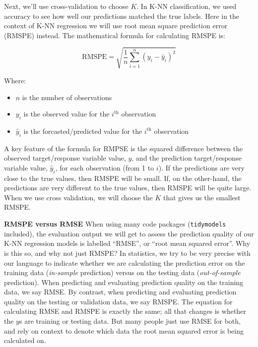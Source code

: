 \documentclass[
]{krantz}
\providecommand{\tightlist}{%
  \setlength{\itemsep}{0pt}\setlength{\parskip}{0pt}}
\renewenvironment{quote}{\begin{VF}}{\end{VF}}
\begin{document}
Next, we'll use cross-validation to choose \(K\). In K-NN classification, we used
accuracy to see how well our predictions matched the true labels. Here in the
context of K-NN regression we will use root mean square prediction error
(RMSPE) instead. The mathematical formula for calculating RMSPE is:

\[\text{RMSPE} = \sqrt{\frac{1}{n}\sum\limits_{i=1}^{n}(y_i - \hat{y}_i)^2}\]

Where:

\begin{itemize}
\tightlist
\item
  \(n\) is the number of observations
\item
  \(y_i\) is the observed value for the \(i^\text{th}\) observation
\item
  \(\hat{y}_i\) is the forcasted/predicted value for the \(i^\text{th}\) observation
\end{itemize}

A key feature of the formula for RMPSE is the squared difference between the observed
target/response variable value, \(y\), and the prediction target/response
variable value, \(\hat{y}_i\), for each observation (from 1 to \(i\)).
If the predictions are very close to the true values, then
RMSPE will be small. If, on the other-hand, the predictions are very
different to the true values, then RMSPE will be quite large. When we
use cross validation, we will choose the \(K\) that gives
us the smallest RMSPE.

\begin{quote}
\textbf{RMSPE versus RMSE}
When using many code packages (\texttt{tidymodels} included), the evaluation output
we will get to assess the prediction quality of
our K-NN regression models is labelled ``RMSE'', or ``root mean squared
error''. Why is this so, and why not just RMSPE?
In statistics, we try to be very precise with our
language to indicate whether we are calculating the prediction error on the
training data (\emph{in-sample} prediction) versus on the testing data
(\emph{out-of-sample} prediction). When predicting and evaluating prediction quality on the training data, we
say RMSE. By contrast, when predicting and evaluating prediction quality
on the testing or validation data, we say RMSPE.
The equation for calculating RMSE and RMSPE is exactly the same; all that changes is whether the \(y\)s are
training or testing data. But many people just use RMSE for both,
and rely on context to denote which data the root mean squared error is being calculated on.
\end{quote}
\end{document}
